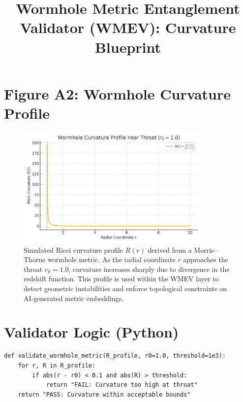 \documentclass{article}
\title{Wormhole Metric Entanglement Validator (WMEV): Curvature Blueprint}
\author{}
\date{}
\begin{document}
\maketitle

\section*{Figure A2: Wormhole Curvature Profile}
\begin{figure}[h!]
\centering
\includegraphics[width=0.85\textwidth]{wormhole_curvature_profile.png}
\caption{Simulated Ricci curvature profile $R(r)$ derived from a Morris--Thorne wormhole metric. As the radial coordinate $r$ approaches the throat $r_0 = 1.0$, curvature increases sharply due to divergence in the redshift function. This profile is used within the WMEV layer to detect geometric instabilities and enforce topological constraints on AI-generated metric embeddings.}
\end{figure}

\section*{Validator Logic (Python)}

\begin{verbatim}
def validate_wormhole_metric(R_profile, r0=1.0, threshold=1e3):
    for r, R in R_profile:
        if abs(r - r0) < 0.1 and abs(R) > threshold:
            return "FAIL: Curvature too high at throat"
    return "PASS: Curvature within acceptable bounds"
\end{verbatim}
\end{document}
